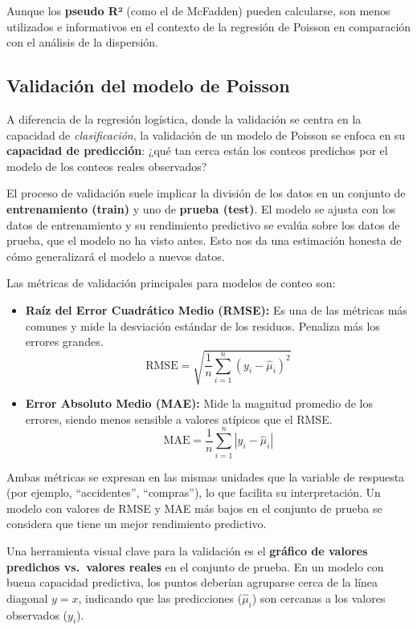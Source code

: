 \documentclass[
  letterpaper,
  DIV=11,
  numbers=noendperiod]{scrreprt}
\begin{document}
Aunque los \textbf{pseudo R²} (como el de McFadden) pueden calcularse,
son menos utilizados e informativos en el contexto de la regresión de
Poisson en comparación con el análisis de la dispersión.

\subsection{Validación del modelo de
Poisson}\label{validaciuxf3n-del-modelo-de-poisson}

A diferencia de la regresión logística, donde la validación se centra en
la capacidad de \emph{clasificación}, la validación de un modelo de
Poisson se enfoca en su \textbf{capacidad de predicción}: ¿qué tan cerca
están los conteos predichos por el modelo de los conteos reales
observados?

El proceso de validación suele implicar la división de los datos en un
conjunto de \textbf{entrenamiento (train)} y uno de \textbf{prueba
(test)}. El modelo se ajusta con los datos de entrenamiento y su
rendimiento predictivo se evalúa sobre los datos de prueba, que el
modelo no ha visto antes. Esto nos da una estimación honesta de cómo
generalizará el modelo a nuevos datos.

Las métricas de validación principales para modelos de conteo son:

\begin{itemize}
\item
  \textbf{Raíz del Error Cuadrático Medio (RMSE):} Es una de las
  métricas más comunes y mide la desviación estándar de los residuos.
  Penaliza más los errores grandes. \[
  \text{RMSE} = \sqrt{\frac{1}{n}\sum_{i=1}^{n}(y_i - \hat{\mu}_i)^2}
  \]
\item
  \textbf{Error Absoluto Medio (MAE):} Mide la magnitud promedio de los
  errores, siendo menos sensible a valores atípicos que el RMSE. \[
  \text{MAE} = \frac{1}{n}\sum_{i=1}^{n}|y_i - \hat{\mu}_i|
  \]
\end{itemize}

Ambas métricas se expresan en las mismas unidades que la variable de
respuesta (por ejemplo, ``accidentes'', ``compras''), lo que facilita su
interpretación. Un modelo con valores de RMSE y MAE más bajos en el
conjunto de prueba se considera que tiene un mejor rendimiento
predictivo.

Una herramienta visual clave para la validación es el \textbf{gráfico de
valores predichos vs.~valores reales} en el conjunto de prueba. En un
modelo con buena capacidad predictiva, los puntos deberían agruparse
cerca de la línea diagonal \(y=x\), indicando que las predicciones
(\(\hat{\mu}_i\)) son cercanas a los valores observados (\(y_i\)).
\end{document}
